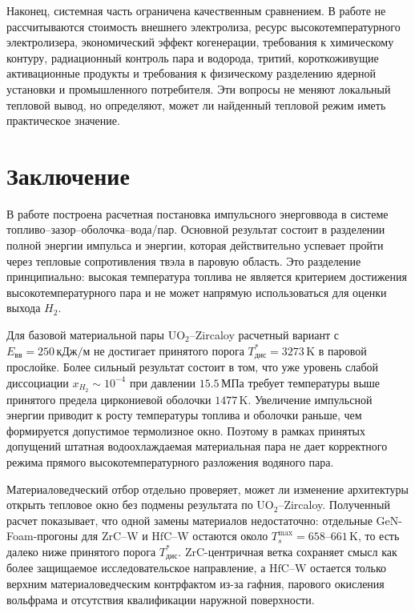 \documentclass[12pt]{article}
\begin{document}
Наконец, системная часть ограничена качественным сравнением. В работе не рассчитываются стоимость внешнего электролиза, ресурс высокотемпературного электролизера, экономический эффект когенерации, требования к химическому контуру, радиационный контроль пара и водорода, тритий, короткоживущие активационные продукты и требования к физическому разделению ядерной установки и промышленного потребителя. Эти вопросы не меняют локальный тепловой вывод, но определяют, может ли найденный тепловой режим иметь практическое значение.

\section{Заключение}

В работе построена расчетная постановка импульсного энерговвода в системе топливо--зазор--оболочка--вода/пар. Основной результат состоит в разделении полной энергии импульса и энергии, которая действительно успевает пройти через тепловые сопротивления твэла в паровую область. Это разделение принципиально: высокая температура топлива не является критерием достижения высокотемпературного пара и не может напрямую использоваться для оценки выхода \(H_2\).

Для базовой материальной пары \(\mathrm{UO_2}\)--Zircaloy расчетный вариант с \(E_{\mathrm{вв}}=250\,\mathrm{кДж/м}\) не достигает принятого порога \(T^*_{\mathrm{дис}}=3273\,\mathrm{K}\) в паровой прослойке. Более сильный результат состоит в том, что уже уровень слабой диссоциации \(x_{H_2}\sim10^{-4}\) при давлении \(15.5\,\mathrm{МПа}\) требует температуры выше принятого предела циркониевой оболочки \(1477\,\mathrm{K}\). Увеличение импульсной энергии приводит к росту температуры топлива и оболочки раньше, чем формируется допустимое термолизное окно. Поэтому в рамках принятых допущений штатная водоохлаждаемая материальная пара не дает корректного режима прямого высокотемпературного разложения водяного пара.

Материаловедческий отбор отдельно проверяет, может ли изменение архитектуры открыть тепловое окно без подмены результата по \(\mathrm{UO_2}\)--Zircaloy. Полученный расчет показывает, что одной замены материалов недостаточно: отдельные GeN-Foam-прогоны для \(\mathrm{ZrC}\)--W и \(\mathrm{HfC}\)--W остаются около \(T_s^{\max}=658\text{--}661\,\mathrm{K}\), то есть далеко ниже принятого порога \(T^*_{\mathrm{дис}}\). ZrC-центричная ветка сохраняет смысл как более защищаемое исследовательское направление, а \(\mathrm{HfC}\)--W остается только верхним материаловедческим контрфактом из-за гафния, парового окисления вольфрама и отсутствия квалификации наружной поверхности.
\end{document}
